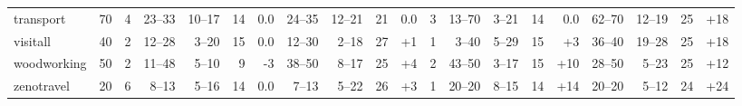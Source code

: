 \documentclass{article}
\begin{document}
\begin{table}
\begin{tabular}{l@{}rr|rrrr|rrrr|r|rrrr|rrrr}
    transport &    70 &   4 &  23--33 & 10--17 & 14 &              0.0 &  24--35 & 12--21 & 21 &               0.0 &   3 &   13--70 &  3--21 & 14 &               0.0 &   62--70 & 12--19 & 25 & {\color{blue}+18} \\
     visitall &    40 &   2 &  12--28 &  3--20 & 15 &              0.0 &  12--30 &  2--18 & 27 &  {\color{blue}+1} &   1 &    3--40 &  5--29 & 15 &  {\color{blue}+3} &   36--40 & 19--28 & 25 & {\color{blue}+18} \\
  woodworking &    50 &   2 &  11--48 &  5--10 &  9 &  {\color{red}-3} &  38--50 &  8--17 & 25 &  {\color{blue}+4} &   2 &   43--50 &  3--17 & 15 & {\color{blue}+10} &   28--50 &  5--23 & 25 & {\color{blue}+12} \\
   zenotravel &    20 &   6 &   8--13 &  5--16 & 14 &              0.0 &   7--13 &  5--22 & 26 &  {\color{blue}+3} &   1 &   20--20 &  8--15 & 14 & {\color{blue}+14} &   20--20 &  5--12 & 24 & {\color{blue}+24} \\
\bottomrule
\end{tabular}

                        \end{table}
                        
\end{document}
